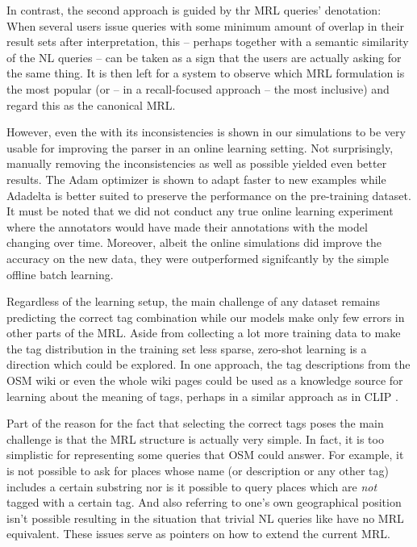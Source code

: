 In contrast, the second approach is guided by thr MRL queries’ denotation: When
several users issue queries with some minimum amount of overlap in their result
sets after interpretation, this – perhaps together with a semantic similarity of
the NL queries – can be taken as a sign that the users are actually asking for
the same thing. It is then left for a system to observe which MRL formulation is
the most popular (or – in a recall-focused approach – the most inclusive) and
regard this as the canonical MRL.

However, even the \nlmapsfourraw{} with its inconsistencies is shown in our
simulations to be very usable for improving the parser in an online learning
setting. Not surprisingly, manually removing the inconsistencies as well as
possible yielded even better results. The Adam optimizer is shown to adapt
faster to new examples while Adadelta is better suited to preserve the
performance on the pre-training dataset. It must be noted that we did not
conduct any true online learning experiment where the annotators would have made
their annotations with the model changing over time. Moreover, albeit the online
simulations did improve the accuracy on the new data, they were outperformed
signifcantly by the simple offline batch learning.

Regardless of the learning setup, the main challenge of any \nlmaps{} dataset
remains predicting the correct tag combination while our models make only few
errors in other parts of the MRL. Aside from collecting a lot more training data
to make the tag distribution in the training set less sparse, zero-shot learning
is a direction which could be explored. In one approach, the tag descriptions
from the OSM wiki or even the whole wiki pages could be used as a knowledge
source for learning about the meaning of tags, perhaps in a similar approach as
in CLIP \parencite{radford-2021}.

Part of the reason for the fact that selecting the correct tags poses the main
challenge is that the MRL structure is actually very simple. In fact, it is too
simplistic for representing some queries that OSM could answer. For example, it
is not possible to ask for places whose name (or description or any other tag)
includes a certain substring nor is it possible to query places which are
\emph{not} tagged with a certain tag. And also referring to one’s own
geographical position isn’t possible resulting in the situation that trivial NL
queries like  have no MRL equivalent. These issues
serve as pointers on how to extend the current MRL.


